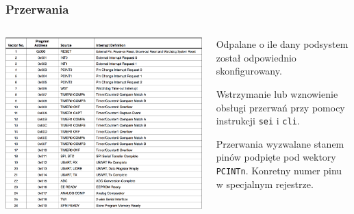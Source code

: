\documentclass[8pt]{beamer}
\begin{document}
\begin{frame}
  \frametitle{Przerwania}

  \begin{columns}
    \begin{column}{8cm}
      \begin{center}
        \includegraphics[scale=0.4]{images/interrupts.png}
      \end{center}
    \end{column}
    
    \begin{column}{2.5cm}
      Odpalane o ile dany podsystem został odpowiednio skonfigurowany.

      \vspace{1em}

      Wstrzymanie lub wznowienie obsługi przerwań przy pomocy instrukcji
      \texttt{sei} i \texttt{cli}.

      \vspace{1em}

      Przerwania wyzwalane stanem pinów podpięte pod wektory \texttt{PCINTn}.
      Konretny numer pinu w specjalnym rejestrze.
    \end{column}
  \end{columns}
\end{frame}
\end{document}
